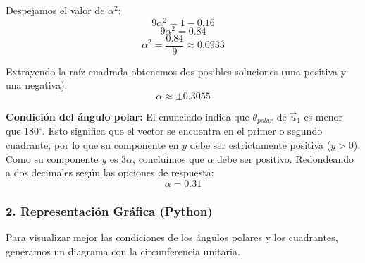 \documentclass[12pt, a4paper]{article}
\begin{document}
Despejamos el valor de $\alpha^2$:
$$9\alpha^2 = 1 - 0.16$$
$$9\alpha^2 = 0.84$$
$$\alpha^2 = \frac{0.84}{9} \approx 0.0933$$

Extrayendo la raíz cuadrada obtenemos dos posibles soluciones (una positiva y una negativa):
$$\alpha \approx \pm 0.3055$$

\textbf{Condición del ángulo polar:} El enunciado indica que $\theta_{polar}$ de $\vec{u}_1$ es menor que $180^\circ$. Esto significa que el vector se encuentra en el primer o segundo cuadrante, por lo que su componente en $y$ debe ser estrictamente positiva ($y > 0$).
Como su componente $y$ es $3\alpha$, concluimos que $\alpha$ debe ser positivo.
Redondeando a dos decimales según las opciones de respuesta:
$$\alpha = 0.31$$

\subsubsection*{2. Representación Gráfica (Python)}
Para visualizar mejor las condiciones de los ángulos polares y los cuadrantes, generamos un diagrama con la circunferencia unitaria.
\end{document}

